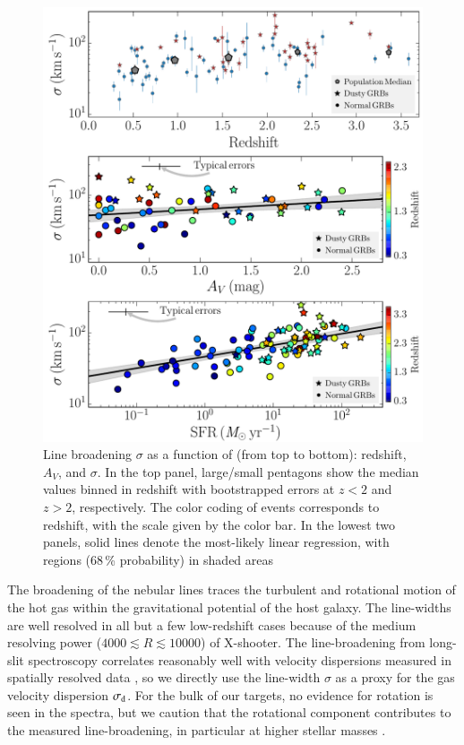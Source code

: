 \documentclass[traditabstract, longauth]{aa}
\begin{document}
\begin{figure}
\includegraphics[angle=0, width=0.99\columnwidth]{Figs/Velo_z.pdf}
\caption{Line broadening $\sigma$ as a function of (from top to bottom): redshift, $A_V$, and $\sigma$. In the top panel, large/small pentagons show the median values binned in redshift with bootstrapped errors at $z<2$ and $z>2$, respectively. The color coding of events corresponds to redshift, with the scale given by the color bar. In the lowest two panels, solid lines denote the most-likely linear regression, with regions (68\,\% probability) in shaded areas}
\label{fig:veloz}
\end{figure}

The broadening of the nebular lines traces the turbulent and rotational motion of the hot gas within the gravitational potential of the host galaxy. The line-widths are well resolved in all but a few low-redshift cases because of the medium resolving power ($4000\lesssim R \lesssim 10000$) of X-shooter. The line-broadening from long-slit spectroscopy correlates reasonably well with velocity dispersions measured in spatially resolved data \citep{2011MNRAS.413..643R}, so we directly use the line-width $\sigma$ as a proxy for the gas velocity dispersion $\sigma_{\rm{d}}$. For the bulk of our targets, no evidence for rotation is seen in the spectra, but we caution that the rotational component contributes to the measured line-broadening, in particular at higher stellar masses \citep[e.g.,][]{2009ApJ...706.1364F}.
\end{document}
